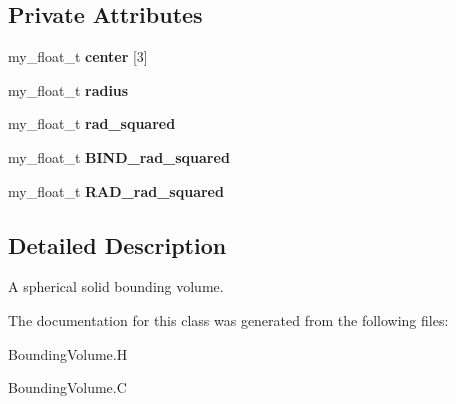 \subsection*{Private Attributes}
\begin{CompactItemize}
\item 
my\_\-float\_\-t \textbf{center} [3]\label{classSimSite3D_1_1Ball_8cdfc3ec26ff94910d7a217fdf00b122}

\item 
my\_\-float\_\-t \textbf{radius}\label{classSimSite3D_1_1Ball_b10e3e683d98de2a313d95db8b1c2b5c}

\item 
my\_\-float\_\-t \textbf{rad\_\-squared}\label{classSimSite3D_1_1Ball_005b5e685fffb4e47e10ffba05f2c608}

\item 
my\_\-float\_\-t \textbf{BIND\_\-rad\_\-squared}\label{classSimSite3D_1_1Ball_46f12f5f5ce2f6ec63af22bb30cbcc39}

\item 
my\_\-float\_\-t \textbf{RAD\_\-rad\_\-squared}\label{classSimSite3D_1_1Ball_6124ef4765e6a8fb6653fae9fb06c927}

\end{CompactItemize}


\subsection{Detailed Description}
A spherical solid bounding volume. 



The documentation for this class was generated from the following files:\begin{CompactItemize}
\item 
Bounding\-Volume.H\item 
Bounding\-Volume.C\end{CompactItemize}
